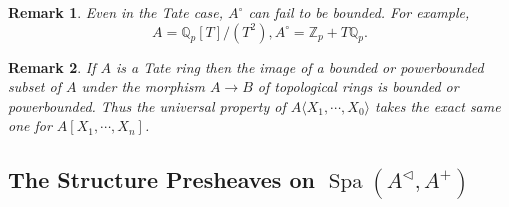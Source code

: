 \documentclass[8pt]{article}
\numberwithin{equation}{section}
\newtheorem{remark}{Remark}[subsection]
\DeclareMathOperator{\Spa}{Spa}
\newcommand{\Z}[0]{\mathbb{Z}}
\newcommand{\Q}[0]{\mathbb{Q}}
\begin{document}
\begin{remark}
    \label{remark_18_3}
    Even in the Tate case, $A^\circ$ can fail to be bounded. For example, 
    \begin{equation*}
        A=\Q_p[T]/(T^2), A^\circ = \Z_p+T\Q_p.
    \end{equation*}
\end{remark}

\begin{remark}
    \label{remark_18_4}
    If $A$ is a Tate ring then the image of a bounded or powerbounded subset of $A$ under the morphism $A\to B$ of topological rings is bounded or powerbounded. 
    Thus the universal property of $A\langle X_1,\cdots,X_0\rangle$ takes the exact same one for $A[X_1,\cdots,X_n]$. %
\end{remark}

\subsection{The Structure Presheaves on $\Spa(A^{\triangleleft},A^+)$}
\end{document}
